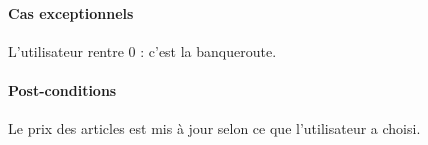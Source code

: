 \paragraph{Cas exceptionnels}
L'utilisateur rentre 0 : c'est la banqueroute. 
\paragraph{Post-conditions}
\begin{list}{}{\leftmargin=1.5em}
\item{Le prix des articles est mis à jour selon ce que l'utilisateur a choisi.}
\end{list}
%
%
%
